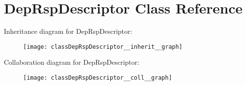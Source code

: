 \hypertarget{classDepRspDescriptor}{}\section{Dep\+Rsp\+Descriptor Class Reference}
\label{classDepRspDescriptor}


Inheritance diagram for Dep\+Rsp\+Descriptor\+:\nopagebreak
\begin{figure}[H]
\begin{center}
\leavevmode
\texttt{[image: classDepRspDescriptor\_\_inherit\_\_graph]}
\end{center}
\end{figure}


Collaboration diagram for Dep\+Rsp\+Descriptor\+:\nopagebreak
\begin{figure}[H]
\begin{center}
\leavevmode
\texttt{[image: classDepRspDescriptor\_\_coll\_\_graph]}
\end{center}
\end{figure}
